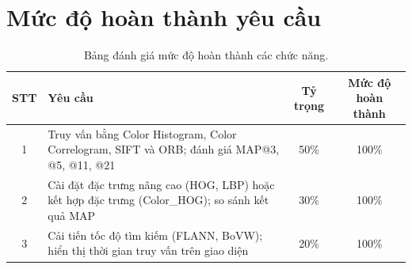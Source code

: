 \chapter{Mức độ hoàn thành yêu cầu}

\begin{table}[H]
\centering
\begin{tabularx}{\textwidth}{|c|X|c|c|}
\hline
\textbf{STT} & \textbf{Yêu cầu} & \textbf{Tỷ trọng} & \textbf{Mức độ hoàn thành} \\
\hline
1 & Truy vấn bằng Color Histogram, Color Correlogram, SIFT và ORB; đánh giá MAP@3, @5, @11, @21 & 50\% & 100\% \\
\hline
2 & Cài đặt đặc trưng nâng cao (HOG, LBP) hoặc kết hợp đặc trưng (Color\_HOG); so sánh kết quả MAP & 30\% & 100\% \\
\hline
3 & Cải tiến tốc độ tìm kiếm (FLANN, BoVW); hiển thị thời gian truy vấn trên giao diện & 20\% & 100\% \\
\hline
\end{tabularx}
\caption{Bảng đánh giá mức độ hoàn thành các chức năng.}
\end{table}
